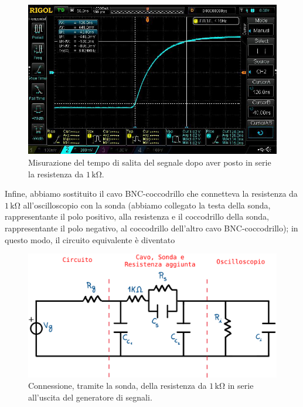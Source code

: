 \documentclass[a4paper]{article}
\begin{document}
				\begin{figure}[h!]
					\centering
					\includegraphics[scale=0.3]{tempoSalitaAltaImpedenza}
					\caption{Misurazione del tempo di salita del segnale dopo aver posto in serie la resistenza da $ 1 \, \mathrm{k\Omega} $.}
					\label{fig:tempoSalitaAltaImpedenza}
				\end{figure}
				\newline
				Infine, abbiamo sostituito il cavo BNC-coccodrillo che connetteva la resistenza da $ 1 \, \mathrm{k\Omega} $ all'oscilloscopio con la sonda (abbiamo collegato la testa della sonda, rappresentante il polo positivo, alla resistenza e il coccodrillo della sonda, rappresentante il polo negativo, al coccodrillo dell'altro cavo BNC-coccodrillo); in questo modo, il circuito equivalente è diventato
				\begin{figure}[h!]
					\centering
					\includegraphics[scale=0.5]{circuitoResistenzaSerieSonda}
					\caption{Connessione, tramite la sonda, della resistenza da $ 1 \, \mathrm{k\Omega} $ in serie all'uscita del generatore di segnali.}
					\label{fig:circuitoResistenzaSerieSonda}
				\end{figure}
\end{document}
